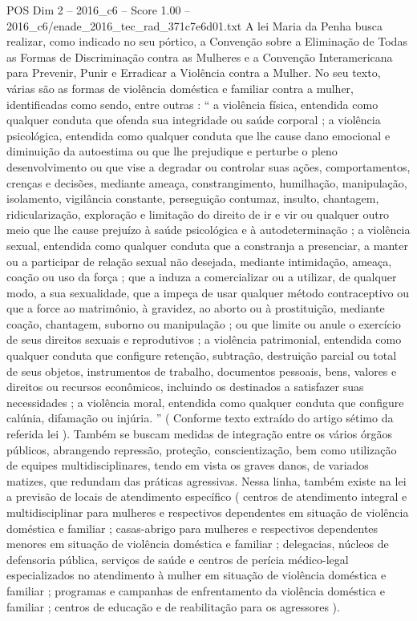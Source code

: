 \begin{textsample}{POS Dim 2 – 2016\_c6 – Score 1.00 – 2016\_c6/enade\_2016\_tec\_rad\_371c7e6d01.txt}
A lei Maria da Penha busca realizar, como indicado no seu pórtico, a Convenção sobre a Eliminação de Todas as Formas de Discriminação contra as Mulheres e a Convenção Interamericana para Prevenir, Punir e Erradicar a Violência contra a Mulher.
No seu texto, várias são as formas de violência doméstica e familiar contra a mulher, identificadas como sendo, entre outras : “ a violência física, entendida como qualquer conduta que ofenda sua integridade ou saúde corporal ; a violência psicológica, entendida como qualquer conduta que lhe cause dano emocional e diminuição da autoestima ou que lhe prejudique e perturbe o pleno desenvolvimento ou que vise a degradar ou controlar suas ações, comportamentos, crenças e decisões, mediante ameaça, constrangimento, humilhação, manipulação, isolamento, vigilância constante, perseguição contumaz, insulto, chantagem, ridicularização, exploração e limitação do direito de ir e vir ou qualquer outro meio que lhe cause prejuízo à saúde psicológica e à autodeterminação ; a violência sexual, entendida como qualquer conduta que a constranja a presenciar, a manter ou a participar de relação sexual não desejada, mediante intimidação, ameaça, coação ou uso da força ; que a induza a comercializar ou a utilizar, de qualquer modo, a sua sexualidade, que a impeça de usar qualquer método contraceptivo ou que a force ao matrimônio, à gravidez, ao aborto ou à prostituição, mediante coação, chantagem, suborno ou manipulação ; ou que limite ou anule o exercício de seus direitos sexuais e reprodutivos ; a violência patrimonial, entendida como qualquer conduta que configure retenção, subtração, destruição parcial ou total de seus objetos, instrumentos de trabalho, documentos pessoais, bens, valores e direitos ou recursos econômicos, incluindo os destinados a satisfazer suas necessidades ; a violência moral, entendida como qualquer conduta que configure calúnia, difamação ou injúria. ” ( Conforme texto extraído do artigo sétimo da referida lei ).
Também se buscam medidas de integração entre os vários órgãos públicos, abrangendo repressão, proteção, conscientização, bem como utilização de equipes multidisciplinares, tendo em vista os graves danos, de variados matizes, que redundam das práticas agressivas.
Nessa linha, também existe na lei a previsão de locais de atendimento específico ( centros de atendimento integral e multidisciplinar para mulheres e respectivos dependentes em situação de violência doméstica e familiar ; casas-abrigo para mulheres e respectivos dependentes menores em situação de violência doméstica e familiar ; delegacias, núcleos de defensoria pública, serviços de saúde e centros de perícia médico-legal especializados no atendimento à mulher em situação de violência doméstica e familiar ; programas e campanhas de enfrentamento da violência doméstica e familiar ; centros de educação e de reabilitação para os agressores ).

\end{textsample}
